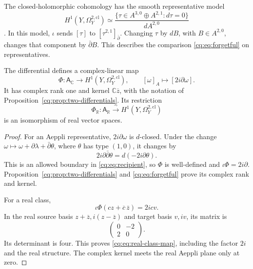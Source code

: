 The closed-holomorphic cohomology has the smooth representative model
\begin{equation}\label{cq:eq:recipient}
 H^1(Y,\Omega_Y^{2,\mathrm{cl}})
 \simeq
 \frac{\{\tau\in A^{3,0}\oplus A^{2,1}:d\tau=0\}}
      {dA^{2,0}}
\end{equation}
\cite[Theorem~3.3]{GFJSCourant}.
In this model, $\iota$ sends $[\tau]$ to
$[\tau^{2,1}]_{\bar\partial}$.
Changing $\tau$ by $dB$, with $B\in A^{2,0}$, changes that
component by $\bar\partial B$.
This describes the comparison \eqref{cq:eq:forgetful} on representatives.

\begin{theorem}\label{cq:thm:class-map}
The differential defines a complex-linear map
\begin{equation}\label{cq:eq:class-map}
 \Phi:\mathsf A_{\mathbb C}\longrightarrow
                   H^1(Y,\Omega_Y^{2,\mathrm{cl}}),\qquad
 [\omega]_A\longmapsto[2i\partial\omega].
\end{equation}
It has complex rank one and kernel $\mathbb C\overline z$,
with the notation of Proposition~\ref{cq:prop:two-differentials}.
Its restriction
\begin{equation}\label{cq:eq:real-class-map}
 \Phi_{\mathbb R}:\mathsf A_{\mathbb R}
          \xrightarrow{\ \sim\ }H^1(Y,\Omega_Y^{2,\mathrm{cl}})
\end{equation}
is an isomorphism of real vector spaces.
\end{theorem}

\begin{proof}
For an Aeppli representative, $2i\partial\omega$ is $d$-closed.
Under the change
$\omega\mapsto\omega+\partial\lambda+\bar\partial\theta$,
where $\theta$ has type $(1,0)$, it changes by
\begin{equation}\label{cq:eq:Aeppli-gauge}
                   2i\partial\bar\partial\theta
                         =d(-2i\partial\theta).
\end{equation}
This is an allowed boundary in \eqref{cq:eq:recipient}, so
$\Phi$ is well-defined and $\iota\Phi=2i\partial$.
Proposition~\ref{cq:prop:two-differentials} and
\eqref{cq:eq:forgetful} prove its complex rank and kernel.

For a real class,
\[
          \iota\Phi(cz+\overline c\,\overline z)=2icv.
\]
In the real source basis $z+\overline z,i(z-\overline z)$
and target basis $v,iv$, its matrix is
\begin{equation}\label{cq:eq:real-matrix}
                     \begin{pmatrix}0&-2\\2&0\end{pmatrix}.
\end{equation}
Its determinant is four. This proves
\eqref{cq:eq:real-class-map}, including the factor $2i$
and the real structure. The complex kernel meets the real
Aeppli plane only at zero.
\end{proof}

